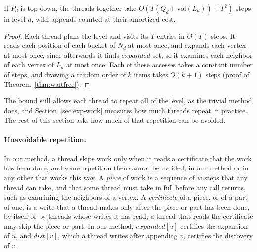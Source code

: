 \begin{theorem}
\label{thm:work-td}
If $P_d$ is top-down, the threads together take $O(T (Q_d + \mathrm{vol}(L_d)) + T^2)$ steps in level $d$, with appends counted at their amortized cost.
\end{theorem}
\begin{proof}
Each thread plans the level and visits its $T$ entries in $O(T)$ steps. It reads each position of each bucket of $N_d$ at most once, and expands each vertex at most once, since afterwards it finds $\mathit{expanded}$ set, so it examines each neighbor of each vertex of $L_d$ at most once. Each of these accesses takes a constant number of steps, and drawing a random order of $k$ items takes $O(k+1)$ steps (proof of Theorem~\ref{thm:waitfree}).
\end{proof}

The bound still allows each thread to repeat all of the level, as the trivial method does, and Section~\ref{sec:exp-work} measures how much threads repeat in practice. The rest of this section asks how much of that repetition can be avoided.

\paragraph{Unavoidable repetition.} In our method, a thread skips work only when it reads a certificate that the work has been done, and some repetition then cannot be avoided, in our method or in any other that works this way. A \emph{piece} of work is a sequence of $w$ steps that any thread can take, and that some thread must take in full before any call returns, such as examining the neighbors of a vertex. A \emph{certificate} of a piece, or of a part of one, is a write that a thread makes only after the piece or part has been done, by itself or by threads whose writes it has read; a thread that reads the certificate may skip the piece or part. In our method, $\mathit{expanded}[u]$ certifies the expansion of $u$, and $\mathit{dist}[v]$, which a thread writes after appending $v$, certifies the discovery of $v$.

